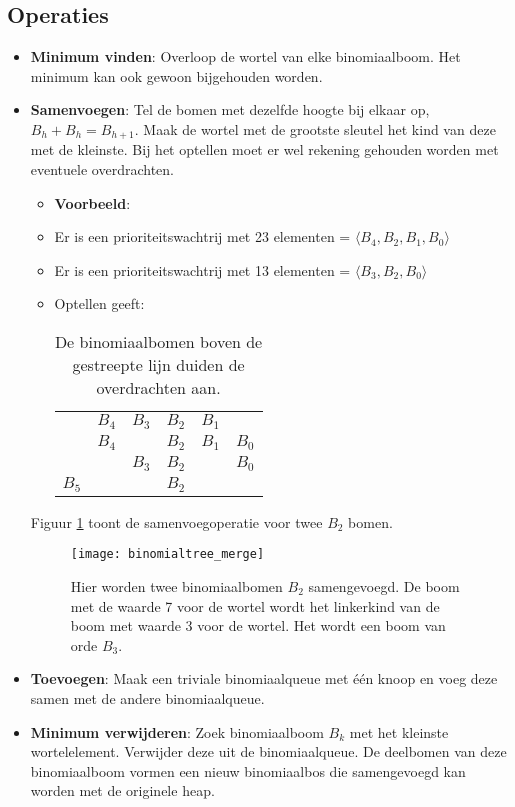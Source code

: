 \subsection{Operaties}
		\begin{itemize}
			\item \textbf{Minimum vinden}: Overloop de wortel van elke binomiaalboom. Het minimum kan ook gewoon bijgehouden worden.
			\item \textbf{Samenvoegen}: Tel de bomen met dezelfde hoogte bij elkaar op, $B_h + B_h = B_{h + 1}$. Maak de wortel met de grootste sleutel het kind van deze met de kleinste. Bij het optellen moet er wel rekening gehouden worden met eventuele overdrachten.
			\begin{itemize}
				\item \textbf{Voorbeeld}:
				\item Er is een prioriteitswachtrij met 23 elementen = $\langle B_4, B_2, B_1, B_0\rangle$
				\item Er is een prioriteitswachtrij met 13 elementen = $\langle B_3, B_2, B_0\rangle$
				\item Optellen geeft:
				\begin{table}[ht]
					\centering
					\begin{tabular}{c c c c c c}
							   & {\tiny$B_4$} & {\tiny$B_3$}      & {\tiny$B_2$} & {\tiny$B_1$} &    \\
							   \hdashline
						      & $B_4$ &       & $B_2$ & $B_1$ & $B_0$  \\
							  &       & $B_3$ & $B_2$ &       & $B_0$ \\
							  \hline
						$B_5$ &		  &		  & $B_2$ &       &		 			
					\end{tabular}
					\caption{De binomiaalbomen boven de gestreepte lijn duiden de overdrachten aan.}
				\end{table}
			\end{itemize}
			
			
			Figuur \ref{fig:binomialtree_fig} toont de samenvoegoperatie voor twee $B_2$ bomen.
			\begin{figure}[ht]
				\centering
				\texttt{[image: binomialtree\_merge]}
				\caption{Hier worden twee binomiaalbomen $B_2$ samengevoegd. De boom met de waarde 7 voor de wortel wordt het linkerkind van de boom met waarde 3 voor de wortel. Het wordt een boom van orde $B_3$.}
				\label{fig:binomialtree_fig}
			\end{figure}
			\item \textbf{Toevoegen}: Maak een triviale binomiaalqueue met één knoop en voeg deze samen met de andere binomiaalqueue.
			\item \textbf{Minimum verwijderen}: Zoek binomiaalboom $B_k$ met het kleinste wortelelement. Verwijder deze uit de binomiaalqueue. De deelbomen van deze binomiaalboom vormen een nieuw binomiaalbos die samengevoegd kan worden met de originele heap.
		\end{itemize}

